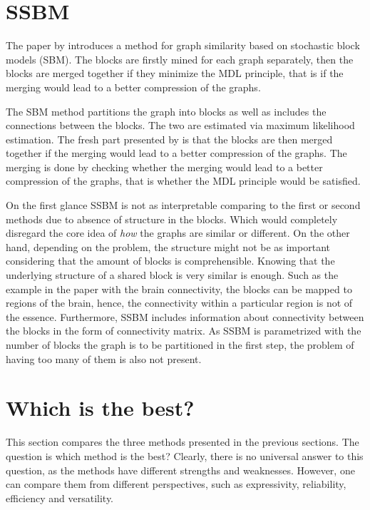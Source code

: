 \documentclass{article}
\begin{document}
\section{SSBM}
The paper by \cite{kumpulainen2025sbm} introduces a method for graph similarity based on stochastic block models (SBM). The blocks are firstly mined for each graph separately, then the blocks are merged together if they minimize the MDL principle, that is if the merging would lead to a better compression of the graphs. 

The SBM method partitions the graph into blocks as well as includes the connections between the blocks. The two are estimated via maximum likelihood estimation. The fresh part presented by \cite{kumpulainen2025sbm} is that the blocks are then merged together if the merging would lead to a better compression of the graphs. The merging is done by checking whether the merging would lead to a better compression of the graphs, that is whether the MDL principle would be satisfied.

On the first glance SSBM is not as interpretable comparing to the first or second methods \citep{coupette2021momo,coupette2022gragra} due to absence of structure in the blocks. Which would completely disregard the core idea of \emph{how} the graphs are similar or different. On the other hand, depending on the problem, the structure might not be as important considering that the amount of blocks is comprehensible. Knowing that the underlying structure of a shared block is very similar is enough. Such as the example in the paper with the brain connectivity, the blocks can be mapped to regions of the brain, hence, the connectivity within a particular region is not of the essence. Furthermore, SSBM includes information about connectivity between the blocks in the form of connectivity matrix. As SSBM is parametrized with the number of blocks the graph is to be partitioned in the first step, the problem of having too many of them is also not present. 


\section{Which is the best?}
\label{sec:comp}
This section compares the three methods presented in the previous sections. The question is which method is the best? Clearly, there is no universal answer to this question, as the methods have different strengths and weaknesses. However, one can compare them from different perspectives, such as expressivity, reliability, efficiency and versatility.
\end{document}
